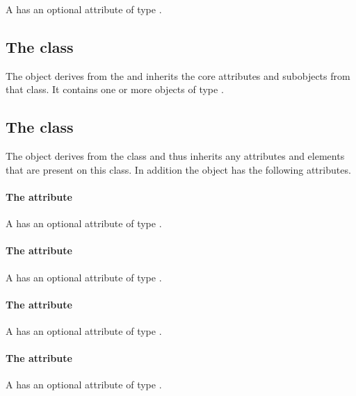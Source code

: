 A \Group has an optional attribute  of type
.


\subsection{The  class}
\label{listofmembers-class}


The \ListOfMembers object derives from the  and inherits
the core attributes and subobjects from that class. It contains one or
more objects of type \Member.

\subsection{The  class}
\label{member-class}




The \Member object derives from the \SBase class and thus inherits any
attributes and elements that are present on this class.
In addition the \Member object has the following attributes.

\paragraph{The \fixttspace{} attribute}

A \Member has an optional attribute  of type
.


\paragraph{The \fixttspace{} attribute}

A \Member has an optional attribute  of type
.


\paragraph{The \fixttspace{} attribute}

A \Member has an optional attribute  of type
.


\paragraph{The \fixttspace{} attribute}

A \Member has an optional attribute  of type
.


